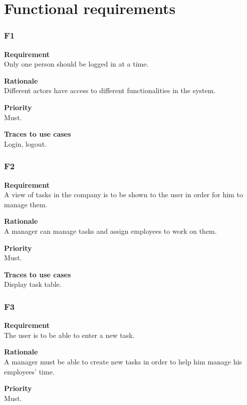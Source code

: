 \documentclass[12pt]{article}
\begin{document}
\section{Functional requirements}

\subsubsection{F1} \label{uc:1}

\noindent
{\bf Requirement}\\
Only one person should be logged in at a time.

\noindent
{\bf Rationale}\\
Different actors have access to different functionalities in the system.

\noindent
{\bf Priority}\\
Must.

\noindent
{\bf Traces to use cases}\\
Login, logout.

\subsubsection{F2} \label{uc:2}

\noindent
{\bf Requirement}\\
A view of tasks in the company is to be shown to the user in order for him to manage them.

\noindent
{\bf Rationale}\\
A manager can manage tasks and assign employees to work on them.

\noindent
{\bf Priority}\\
Must.

\noindent
{\bf Traces to use cases}\\
Display task table.

\subsubsection{F3} \label{uc:3}

\noindent
{\bf Requirement}\\
The user is to be able to enter a new task.

\noindent
{\bf Rationale}\\
A manager must be able to create new tasks in order to help him manage his employees' time.

\noindent
{\bf Priority}\\
Must.
\end{document}
